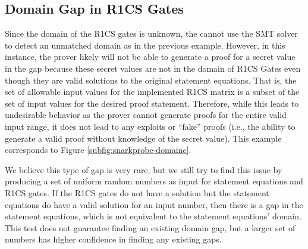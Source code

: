 \subsection{Domain Gap in R1CS Gates}
Since the domain of the R1CS gates is unknown, the \ConstraintChecker cannot use the SMT solver to detect an unmatched domain as in the previous example.
However, in this instance, the prover likely will not be able to generate a proof for a secret value in the gap because these secret values are not in the domain of R1CS Gates even though they are valid solutions to the original statement equations.   That is, the set of allowable input values for the implemented R1CS matrix is a subset of the set of input values for the desired proof statement.  Therefore, while this leads to undesirable behavior as the prover cannot generate proofs for the entire valid input range, it does not lead to any exploits or ``fake'' proofs (i.e., the ability to generate a valid proof without knowledge of the secret value).
This example corresponds to Figure \ref{subfig:snarkprobe-domainc}.

We believe this type of gap is very rare, but we still try to find this issue by producing a set of uniform random numbers as input for statement equations and R1CS gates. If the R1CS gates do not have a solution but the statement equations do have a valid solution for an input number, then there is a gap in the statement equations, which is not equivalent to the statement equations' domain. This test does not guarantee finding an existing domain gap, but a larger set of numbers has higher confidence in finding any existing gaps.

